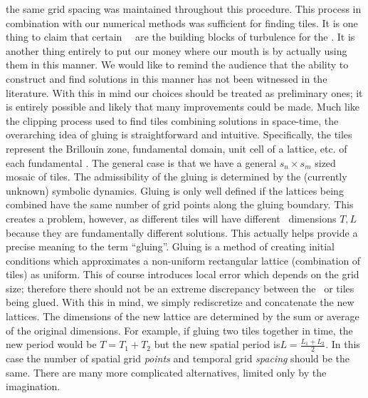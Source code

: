 the same grid spacing was maintained throughout this procedure. 
This process in combination with our numerical methods was sufficient
for finding tiles. 
It is one thing to claim that certain \spt\ \twots\ are the building blocks
of turbulence for the \KSe. It is
another thing entirely to put our money where our mouth is by actually using them in this manner. We would like to remind the audience that the ability to construct and find solutions in this manner
has not been witnessed in the literature. With this in mind our choices should
be treated as preliminary ones; it is entirely possible and likely that
many improvements could be made. 
Much like the clipping process used to find tiles combining solutions in space-time,
the overarching idea of gluing is straightforward and intuitive. 
Specifically, the tiles represent the 
Brillouin zone, fundamental domain, unit cell of a lattice, etc.
of each fundamental \twot. 
The general case is that we have a general $s_n \times s_m$ sized mosaic of tiles.
The admissibility of the gluing is determined by the (currently unknown) symbolic
dynamics. Gluing is only well defined if the lattices being combined have the same
number of grid points along the gluing boundary.
This creates a problem, however, as
different tiles will have different \spt\ dimensions $T,L$ because
they are fundamentally different solutions.
This actually helps provide a precise meaning to the term ``gluing''.
Gluing is a method of creating initial conditions which approximates
a non-uniform rectangular lattice (combination of tiles) as uniform. 
This of course introduces local error which depends on the grid size; therefore
there should not be an extreme discrepancy between the \twots\ or tiles being glued.
With this in mind, we simply rediscretize and concatenate the new lattices.
The dimensions of the new lattice are determined by the sum or average of
the original dimensions.
For example, if gluing two tiles together in time, the new period would be
$T = T_1 + T_2$ but the new spatial period is$L = \frac{L_1 + L_2}{2}$.
In this case the number of spatial grid \emph{points} and temporal grid \emph{spacing}
should be the same. There are many more complicated alternatives, limited only by
the imagination.
